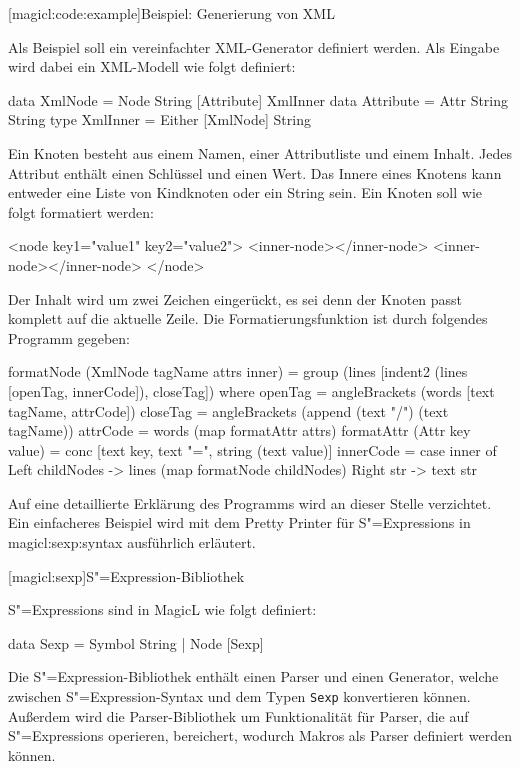 \documentclass[12pt, a4paper, bibgerm]{scrbook}
\newenvironment{DIFnomarkup}{}{}
\newcommand\icode[1]{\lstinline?#1?}
\newcommand\lsection{}
\newcommand\lsubsubsection{}
\newcommand\sref{}
\newcommand{\sexp}{S"=Expression}
\newcommand{\sexps}{S"=Expressions}
\begin{document}
\lsubsubsection[magicl:code:example]{Beispiel: Generierung von XML}

Als Beispiel soll ein vereinfachter XML-Generator definiert werden. Als
Eingabe wird dabei ein XML-Modell wie folgt definiert:
\begin{code}
data XmlNode = Node String [Attribute] XmlInner
data Attribute = Attr String String
type XmlInner = Either [XmlNode] String
\end{code}
Ein Knoten besteht aus einem Namen, einer Attributliste und einem
Inhalt. Jedes Attribut enthält einen Schlüssel und einen Wert. Das
Innere eines Knotens kann entweder eine Liste von Kindknoten oder ein
String sein. Ein Knoten soll wie folgt formatiert werden:
\begin{code}
<node key1="value1" key2="value2">
  <inner-node></inner-node>  
  <inner-node></inner-node>
</node>
\end{code}
Der Inhalt wird um zwei Zeichen eingerückt, es sei denn der Knoten
passt komplett auf die aktuelle Zeile. Die Formatierungsfunktion ist
durch folgendes Programm gegeben:
\begin{code}
formatNode (XmlNode tagName attrs inner) =
  group (lines [indent2 (lines [openTag, innerCode]), closeTag])
  where openTag  = angleBrackets (words [text tagName, attrCode])
        closeTag = angleBrackets (append (text "/") (text tagName))
        attrCode = words (map formatAttr attrs)
        formatAttr (Attr key value) =
          conc [text key, text "=", string (text value)]
        innerCode = case inner of
                      Left childNodes -> lines (map formatNode childNodes)
                      Right str       -> text str    
\end{code}
Auf eine detaillierte Erklärung des Programms wird an dieser Stelle
verzichtet. Ein einfacheres Beispiel wird mit dem Pretty Printer für
\sexps{} in \sref{magicl:sexp:syntax} ausführlich erläutert.

\lsection[magicl:sexp]{\sexp{}-Bibliothek}

\sexps{} sind in MagicL wie folgt definiert:
\begin{DIFnomarkup}\begin{code}
data Sexp = Symbol String
          | Node [Sexp]
\end{code}\end{DIFnomarkup}
Die \sexp{}-Bibliothek enthält einen Parser und einen Generator, welche
zwischen \sexp{}-Syntax und dem Typen \icode{Sexp} konvertieren
können. Außerdem wird die Parser-Bibliothek um Funktionalität für
Parser, die auf \sexps{} operieren, bereichert, wodurch Makros als
Parser definiert werden können.
\end{document}
